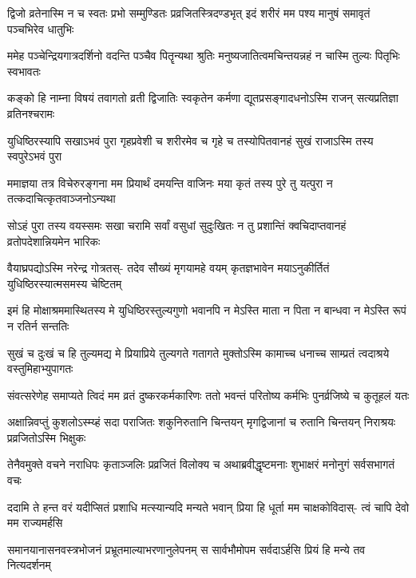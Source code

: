 \fourlineindentedshloka
{द्विजो व्रतेनास्मि न च स्वतः प्रभो}
{सम्मुण्डितः प्रव्रजितस्त्रिदण्डभृत्}
{इदं शरीरं मम पश्य मानुषं}
{समावृतं पञ्चभिरेव धातुभिः}


\fourlineindentedshloka
{ममेह पञ्चेन्द्रियगात्रदर्शिनो}
{वदन्ति पञ्चैव पितॄन्यथा श्रुतिः}
{मनुष्यजातित्वमचिन्तयन्नहं}
{न चास्मि तुल्यः पितृभिः स्वभावतः}


\fourlineindentedshloka
{कङ्को हि नाम्ना विषयं तवागतो}
{व्रती द्विजातिः स्वकृतेन कर्मणा}
{द्यूतप्रसङ्गादधनोऽस्मि राजन्}
{सत्यप्रतिज्ञा व्रतिनश्चरामः}


\fourlineindentedshloka
{युधिष्ठिरस्यापि सखाऽभवं पुरा}
{गृहप्रवेशी च शरीरमेव च}
{गृहे च तस्योपितवानहं सुखं}
{राजाऽस्मि तस्य स्वपुरेऽभवं पुरा}


\fourlineindentedshloka
{ममाज्ञया तत्र विचेरुरङ्गना}
{मम प्रियार्थं दमयन्ति वाजिनः}
{मया कृतं तस्य पुरे तु यत्पुरा}
{न तत्कदाचित्कृतवाञ्जनोऽन्यथा}


\fourlineindentedshloka
{सोऽहं पुरा तस्य वयस्समः सखा}
{चरामि सर्वां वसुधां सुदुःखितः}
{न तु प्रशान्तिं क्वचिदाप्तवानहं}
{व्रतोपदेशान्नियमेन भारिकः}


\fourlineindentedshloka
{वैयाघ्रपद्योऽस्मि नरेन्द्र गोत्रतस्-}
{तदेव सौख्यं मृगयामहे वयम्}
{कृतज्ञभावेन मयाऽनुकीर्तितं}
{युधिष्ठिरस्यात्मसमस्य चेष्टितम्}


\fourlineindentedshloka
{इमं हि मोक्षाश्रममास्थितस्य मे}
{युधिष्ठिरस्तुल्यगुणो भवानपि}
{न मेऽस्ति माता न पिता न बान्धवा}
{न मेऽस्ति रूपं न रतिर्न सन्ततिः}


\fourlineindentedshloka
{सुखं च दुःखं च हि तुल्यमद्य मे}
{प्रियाप्रिये तुल्यगते गतागते}
{मुक्तोऽस्मि कामाच्च धनाच्च साम्प्रतं}
{त्वदाश्रये वस्तुमिहाभ्युपागतः}


\fourlineindentedshloka
{संवत्सरेणेह समाप्यते त्विदं}
{मम व्रतं दुष्करकर्मकारिणः}
{ततो भवन्तं परितोष्य कर्मभिः}
{पुनर्व्रजिष्ये च कुतूहलं यतः}


\fourlineindentedshloka
{अक्षान्निवप्तुं कुशलोऽस्म्य्हं सदा}
{पराजितः शकुनिरुतानि चिन्तयन्}
{मृगद्विजानां च रुतानि चिन्तयन्}
{निराश्रयः प्रव्रजितोऽस्मि भिक्षुकः}



\fourlineindentedshloka
{तेनैवमुक्ते वचने नराधिपः}
{कृताञ्जलिः प्रव्रजितं विलोक्य च}
{अथाब्रवीद्धृष्टमनाः शुभाक्षरं}
{मनोनुगं सर्वसभागतं वचः}


\fourlineindentedshloka
{ददामि ते हन्त वरं यदीप्सितं}
{प्रशाधि मत्स्यान्यदि मन्यते भवान्}
{प्रिया हि धूर्ता मम चाक्षकोविदास्-}
{त्वं चापि देवो मम राज्यमर्हसि}


\fourlineindentedshloka
{समानयानासनवस्त्रभोजनं}
{प्रभ्रूतमाल्याभरणानुलेपनम्}
{स सार्वभौमोपम सर्वदाऽर्हसि}
{प्रियं हि मन्ये तव नित्यदर्शनम्}


